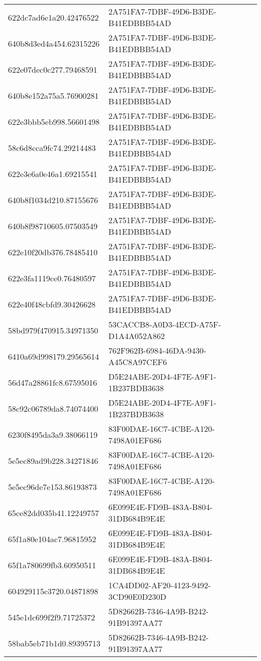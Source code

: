 \begin{tabular}{ll}
622dc7ad6e1a20.42476522 & 2A751FA7-7DBF-49D6-B3DE-B41EDBBB54AD \\
640b8d3ed4a454.62315226 & 2A751FA7-7DBF-49D6-B3DE-B41EDBBB54AD \\
622e07dec0c277.79468591 & 2A751FA7-7DBF-49D6-B3DE-B41EDBBB54AD \\
640b8e152a75a5.76900281 & 2A751FA7-7DBF-49D6-B3DE-B41EDBBB54AD \\
622e3bbb5eb998.56601498 & 2A751FA7-7DBF-49D6-B3DE-B41EDBBB54AD \\
58c6d8cca9fc74.29214483 & 2A751FA7-7DBF-49D6-B3DE-B41EDBBB54AD \\
622e3e6a0e46a1.69215541 & 2A751FA7-7DBF-49D6-B3DE-B41EDBBB54AD \\
640b8f1034d210.87155676 & 2A751FA7-7DBF-49D6-B3DE-B41EDBBB54AD \\
640b8f98710605.07503549 & 2A751FA7-7DBF-49D6-B3DE-B41EDBBB54AD \\
622e10f20db376.78485410 & 2A751FA7-7DBF-49D6-B3DE-B41EDBBB54AD \\
622e3fa1119ce0.76480597 & 2A751FA7-7DBF-49D6-B3DE-B41EDBBB54AD \\
622e40f48cbfd9.30426628 & 2A751FA7-7DBF-49D6-B3DE-B41EDBBB54AD \\
58bd979f470915.34971350 & 53CACCB8-A0D3-4ECD-A75F-D1A4A052A862 \\
6410a69d998179.29565614 & 762F962B-6984-46DA-9430-A45C8A97CEF6 \\
56d47a28861fc8.67595016 & D5E24ABE-20D4-4F7E-A9F1-1B237BDB3638 \\
58c92c06789da8.74074400 & D5E24ABE-20D4-4F7E-A9F1-1B237BDB3638 \\
6230f8495da3a9.38066119 & 83F00DAE-16C7-4CBE-A120-7498A01EF686 \\
5e5ec89ad9b228.34271846 & 83F00DAE-16C7-4CBE-A120-7498A01EF686 \\
5e5ec96de7e153.86193873 & 83F00DAE-16C7-4CBE-A120-7498A01EF686 \\
65ce82dd035b41.12249757 & 6E099E4E-FD9B-483A-B804-31DB684B9E4E \\
65f1a80e104ac7.96815952 & 6E099E4E-FD9B-483A-B804-31DB684B9E4E \\
65f1a780699fb3.60950511 & 6E099E4E-FD9B-483A-B804-31DB684B9E4E \\
604929115c3720.04871898 & 1CA4DD02-AF20-4123-9492-3CD90E0D230D \\
545e1dc699f2f9.71725372 & 5D82662B-7346-4A9B-B242-91B91397AA77 \\
58bab5eb71b1d0.89395713 & 5D82662B-7346-4A9B-B242-91B91397AA77 \\

\end{tabular}
